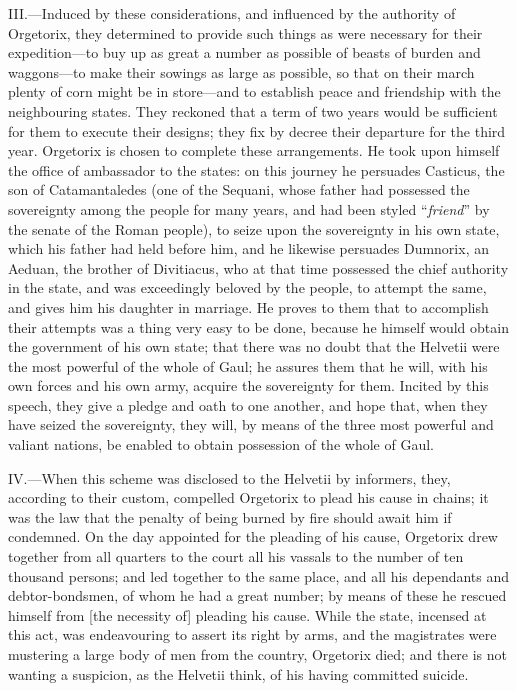 III.—Induced by these considerations, and influenced by the authority
of Orgetorix, they determined to provide such things as were necessary
for their expedition—to buy up as great a number as possible of beasts
of burden and waggons—to make their sowings as large as possible, so
that on their march plenty of corn might be in store—and to establish
peace and friendship with the neighbouring states. They reckoned that a
term of two years would be sufficient for them to execute their designs;
they fix by decree their departure for the third year. Orgetorix is
chosen to complete these arrangements. He took upon himself the office
of ambassador to the states: on this journey he persuades Casticus, the
son of Catamantaledes (one of the Sequani, whose father had possessed
the sovereignty among the people for many years, and had been styled
``\emph{friend}'' by the senate of the Roman people), to seize upon the
sovereignty in his own state, which his father had held before him, and
he likewise persuades Dumnorix, an Aeduan, the brother of Divitiacus,
who at that time possessed the chief authority in the state, and was
exceedingly beloved by the people, to attempt the same, and gives him
his daughter in marriage. He proves to them that to accomplish their
attempts was a thing very easy to be done, because he himself would
obtain the government of his own state; that there was no doubt that the
Helvetii were the most powerful of the whole of Gaul; he assures them
that he will, with his own forces and his own army, acquire the
sovereignty for them. Incited by this speech, they give a pledge and
oath to one another, and hope that, when they have seized the
sovereignty, they will, by means of the three most powerful and valiant
nations, be enabled to obtain possession of the whole of Gaul.

IV.—When this scheme was disclosed to the Helvetii by informers, they,
according to their custom, compelled Orgetorix to plead his cause in
chains; it was the law that the penalty of being burned by fire should
await him if condemned. On the day appointed for the pleading of his
cause, Orgetorix drew together from all quarters to the court all his
vassals to the number of ten thousand persons; and led together to the
same place, and all his dependants and debtor-bondsmen, of whom he had a
great number; by means of these he rescued himself from [the necessity
of] pleading his cause. While the state, incensed at this act, was
endeavouring to assert its right by arms, and the magistrates were
mustering a large body of men from the country, Orgetorix died; and
there is not wanting a suspicion, as the Helvetii think, of his having
committed suicide.

